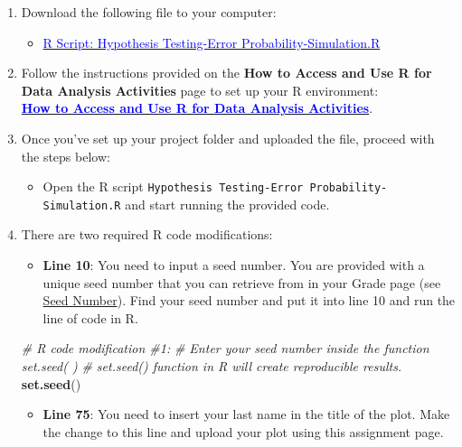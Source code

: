 \documentclass[oneside,openany]{book}
\newenvironment{Shaded}{\begin{snugshade}}{\end{snugshade}}
\newcommand{\CommentTok}[1]{\textcolor[rgb]{0.56,0.35,0.01}{\textit{#1}}}
\newcommand{\FunctionTok}[1]{\textcolor[rgb]{0.13,0.29,0.53}{\textbf{#1}}}
\newcommand{\NormalTok}[1]{#1}
\providecommand{\tightlist}{%
  \setlength{\itemsep}{0pt}\setlength{\parskip}{0pt}}
\begin{document}
\begin{enumerate}
\def\labelenumi{\arabic{enumi}.}
\item
  Download the following file to your computer:

  \begin{itemize}
  \tightlist
  \item
    \href{https://raw.githubusercontent.com/aslemand/Data-Analysis-Activities/main/data/Activity_6/Hypothesis-Testing-Error-Probability-Simulation.R}{\textcolor{blue}{R Script: Hypothesis Testing-Error Probability-Simulation.R}}
  \end{itemize}
\item
  Follow the instructions provided on the \textbf{How to Access and Use R for Data Analysis Activities} page to set up your R environment:\\
  \hyperref[how-to-set-up-r-for-data-analysis-activities]{\textcolor{blue}{\textbf{How to Access and Use R for Data Analysis Activities}}}.
\item
  Once you've set up your project folder and uploaded the file, proceed with the steps below:

  \begin{itemize}
  \tightlist
  \item
    Open the R script \texttt{Hypothesis\ Testing-Error\ Probability-Simulation.R} and start running the provided code.
  \end{itemize}
\item
  There are two required R code modifications:

  \begin{itemize}
  \tightlist
  \item
    \textbf{Line 10}: You need to input a seed number. You are provided with a unique seed number that you can retrieve from  in your Grade page (see \hyperref[]{Seed Number}). Find your seed number and put it into line 10 and run the line of code in R.
  \end{itemize}

\begin{Shaded}
\begin{Highlighting}[]
\CommentTok{\# R code modification \#1: }
\CommentTok{\# Enter your seed number inside the function set.seed( ) }
\CommentTok{\# set.seed() function in R will create reproducible results.}
\FunctionTok{set.seed}\NormalTok{()}
\end{Highlighting}
\end{Shaded}

  \begin{itemize}
  \tightlist
  \item
    \textbf{Line 75}: You need to insert your last name in the title of the plot. Make the change to this line and upload your plot using this assignment page.
  \end{itemize}


\end{enumerate}
\end{document}
